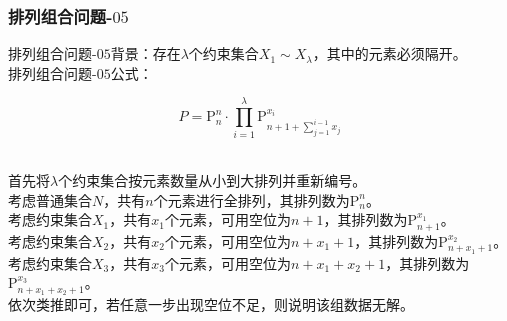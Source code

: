 \documentclass[UTF8]{ctexart}
\newcommand{\rnum}[1]{\uppercase\expandafter{\romannumeral #1\relax}}
\begin{document}
\subsubsection{排列组合问题\rnum{1}-$05$}
    排列组合问题\rnum{1}-$05$背景：存在$\lambda$个约束集合$X_1\sim X_\lambda$，其中的元素必须隔开。\\[3mm]
    排列组合问题\rnum{1}-$05$公式：
    \begin{large}
        \begin{equation*}
            P=\mathrm{P}_{n}^{n}\cdot\prod_{i=1}^\lambda\mathrm{P}_{n+1+\sum_{j=1}^{i-1}x_j}^{x_i}
        \end{equation*}
    \end{large}\\
    首先将$\lambda$个约束集合按元素数量从小到大排列并重新编号。\\[3mm]
    考虑普通集合$N$，共有$n$个元素进行全排列，其排列数为$\mathrm{P}_{n}^{n}$。\\[3mm]
    考虑约束集合$X_1$，共有$x_1$个元素，可用空位为$n+1$，其排列数为$\mathrm{P}_{n+1}^{x_1}$。\\[3mm]
    考虑约束集合$X_2$，共有$x_2$个元素，可用空位为$n+x_1+1$，其排列数为$\mathrm{P}_{n+x_1+1}^{x_2}$。\\[3mm]
    考虑约束集合$X_3$，共有$x_3$个元素，可用空位为$n+x_1+x_2+1$，其排列数为$\mathrm{P}_{n+x_1+x_2+1}^{x_3}$。\\[3mm]
    依次类推即可，若任意一步出现空位不足，则说明该组数据无解。\vspace{8pt}

\newpage
\end{document}
